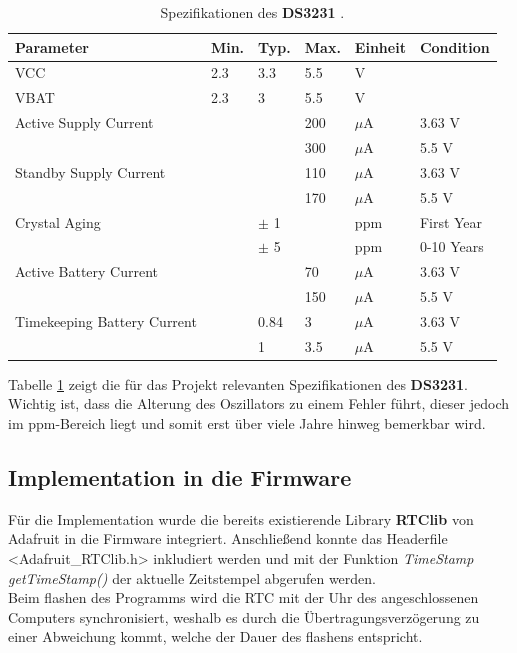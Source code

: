 \newpage
\begin{table}
\begin{tabular}{llllll}
\hline 
\textbf{Parameter} & \textbf{Min.} & \textbf{Typ.} & \textbf{Max.} & \textbf{Einheit} & \textbf{Condition} \\ 
\hline 
VCC & 2.3 & 3.3 & 5.5 & V &  \\ 
VBAT & 2.3 & 3 & 5.5 & V &  \\ 
Active Supply Current &  &  & 200 & $\mu$A & 3.63 V \\ 
 &  &  & 300 & $\mu$A & 5.5 V \\ 
Standby Supply Current &  & & 110 & $\mu$A & 3.63 V \\ 
 &  &  & 170 & $\mu$A & 5.5 V \\ 
Crystal Aging &  & $\pm$ 1 &  & ppm & First Year \\ 
 &  & $\pm$ 5 &  & ppm & 0-10 Years \\ 
Active Battery Current &  &  & 70 & $\mu$A & 3.63 V \\ 
 &  &  & 150 & $\mu$A & 5.5 V \\ 
Timekeeping Battery Current &  & 0.84 & 3 & $\mu$A & 3.63 V \\ 
 &  & 1 & 3.5 & $\mu$A & 5.5 V \\ 
\hline 
\end{tabular} 
\caption{Spezifikationen des \textbf{DS3231} \cite{DS3231DS}.}
\label{tab:DS3231}
\end{table}

Tabelle \ref{tab:DS3231} zeigt die für das Projekt relevanten Spezifikationen des \textbf{DS3231}. Wichtig ist, dass die Alterung des Oszillators zu einem Fehler führt, dieser jedoch im ppm-Bereich liegt und somit erst über viele Jahre hinweg bemerkbar wird.

\subsection{Implementation in die Firmware}
Für die Implementation wurde die bereits existierende Library \textbf{RTClib} von Adafruit in die Firmware integriert. Anschließend konnte das Headerfile <Adafruit\_RTClib.h> inkludiert werden und mit der Funktion \textit{TimeStamp getTimeStamp()} der aktuelle Zeitstempel abgerufen werden. \\
Beim flashen des Programms wird die RTC mit der Uhr des angeschlossenen Computers synchronisiert, weshalb es durch die Übertragungsverzögerung zu einer Abweichung kommt, welche der Dauer des flashens entspricht.